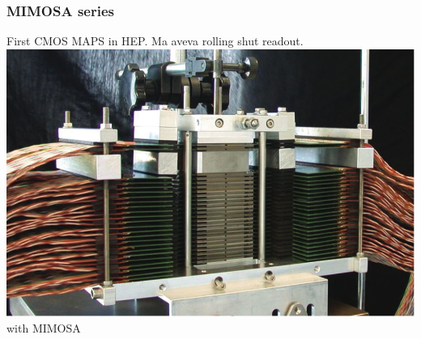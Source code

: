     \begin{frame}
        \frametitle{MIMOSA series}
        First CMOS MAPS in HEP. Ma aveva rolling shut readout. 
        \includegraphics[width=.45\linewidth]{figures/pixel_detectors_usage/ALICE_FoCAL.png} with MIMOSA
    \end{frame} 



